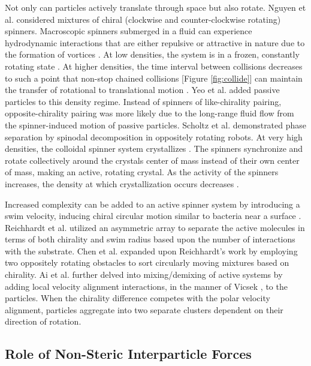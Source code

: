 \documentclass[11pt]{article}
\begin{document}
Not only can particles actively translate through space but also rotate.  Nguyen et al. \cite{Nguyen} considered mixtures of chiral (clockwise and counter-clockwise rotating) spinners.  Macroscopic spinners submerged in a fluid \cite{Grzybowski, Grzybowski2} can experience hydrodynamic interactions \cite{Drescher, Ischikawa} that are either repulsive or attractive in nature due to the formation of vortices \cite{Han, Kokot}. At low densities, the system is in a frozen, constantly rotating state \cite{Hinrichsen}.  At higher densities, the time interval between collisions decreases to such a point that non-stop chained collisions [Figure \ref{fig:collide}] can maintain the transfer of rotational to translational motion \cite{Nguyen}.  Yeo et al. \cite{Kyongmin} added passive particles to this density regime.  Instead of spinners of like-chirality pairing, opposite-chirality pairing was more likely due to the long-range fluid flow from the spinner-induced motion of passive particles.  Scholtz et al. \cite{Scholz} demonstrated phase separation by spinodal decomposition in oppositely rotating robots.  At very high densities, the colloidal spinner system crystallizes \cite{Nguyen}. The spinners synchronize and rotate collectively around the crystals center of mass instead of their own center of mass, making an active, rotating crystal.  As the activity of the spinners increases, the density at which crystallization occurs decreases \cite{Redner, Bialke2}.  

Increased complexity can be added to an active spinner system by introducing a swim velocity, inducing chiral circular motion similar to bacteria near a surface \cite{Lemelle}.  Reichhardt et al. \cite{Reichhardt} utilized an asymmetric array to separate the active molecules in terms of both chirality and swim radius based upon the number of interactions with the substrate.  Chen et al. \cite{Chen5} expanded upon Reichhardt's work by employing two oppositely rotating obstacles to sort circularly moving mixtures based on chirality.  Ai et al. \cite{Ai} further delved into mixing/demixing of active systems by adding local velocity alignment interactions, in the manner of Vicsek \cite{Vicsek}, to the particles.  When the chirality difference competes with the polar velocity alignment, particles aggregate into two separate clusters dependent on their direction of rotation.

\subsection{Role of Non-Steric Interparticle Forces}\label{interactionmech}
\end{document}
